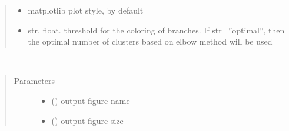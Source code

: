 \documentclass[letterpaper,10pt,english]{sphinxmanual}
\begin{document}
\begin{fulllineitems}
\begin{fulllineitems}
\begin{quote}
\begin{description}
\begin{itemize}
\item {} 
\sphinxAtStartPar
{} \textendash{} matplotlib plot style,  by default

\item {} 
\sphinxAtStartPar
{} \textendash{} str, float. threshold for the coloring of branches. If str=”optimal”, then the optimal number of clusters based on elbow method will be used

\end{itemize}

\end{description}\end{quote}

\end{fulllineitems}


\begin{fulllineitems}
\label{\detokenize{modules/dtw_analysis:dtwhaclustering.dtw_analysis.dtw_clustering.plot_signals}}~\begin{quote}\begin{description}
\item[{Parameters}] \leavevmode\begin{itemize}
\item {} 
\sphinxAtStartPar
{} () \textendash{} output figure name

\item {} 
\sphinxAtStartPar
{} () \textendash{} output figure size

\end{itemize}

\end{description}\end{quote}

\end{fulllineitems}


\end{fulllineitems}
\end{document}
